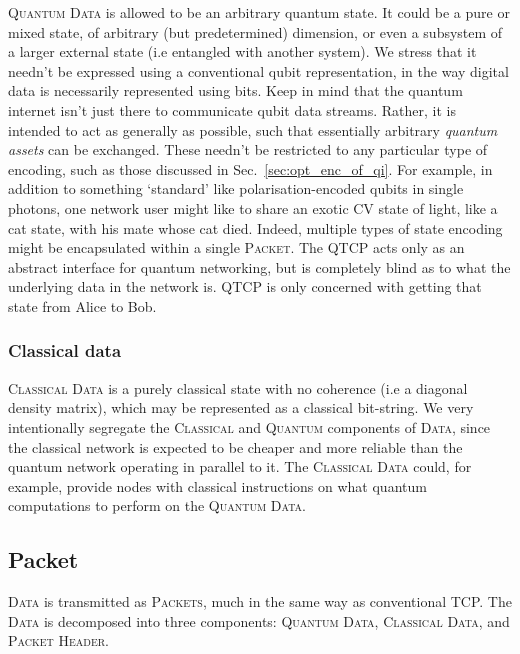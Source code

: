 \documentclass[aps, rmp, twocolumn, amsmath, amssymb, nofootinbib, superscriptaddress, longbibliography, floatfix, table-of-contents, eqsecnum]{revtex4-1}
\begin{document}
\textsc{Quantum Data} is allowed to be an arbitrary quantum state. It could be a pure or mixed state, of arbitrary (but predetermined) dimension, or even a subsystem of a larger external state (i.e entangled with another system). We stress that it needn't be expressed using a conventional qubit representation, in the way digital data is necessarily represented using bits. Keep in mind that the quantum internet isn't just there to communicate qubit data streams. Rather, it is intended to act as generally as possible, such that essentially arbitrary \textit{quantum assets} can be exchanged. These needn't be restricted to any particular type of encoding, such as those discussed in Sec.~\ref{sec:opt_enc_of_qi}. For example, in addition to something `standard' like polarisation-encoded qubits in single photons, one network user might like to share an exotic CV state of light, like a cat state, with his mate whose cat died. Indeed, multiple types of state encoding might be encapsulated within a single \textsc{Packet}. The QTCP acts only as an abstract interface for quantum networking, but is completely blind as to what the underlying data in the network is. QTCP is only concerned with getting that state from Alice to Bob.

%
%

\subsubsection{Classical data} 

\textsc{Classical Data} is a purely classical state with no coherence (i.e a diagonal density matrix), which may be represented as a classical bit-string. We very intentionally segregate the \textsc{Classical} and \textsc{Quantum} components of \textsc{Data}, since the classical network is expected to be cheaper and more reliable than the quantum network operating in parallel to it. The \textsc{Classical Data} could, for example, provide nodes with classical instructions on what quantum computations to perform on the \textsc{Quantum Data}.

%
%

\subsection{Packet} 

\textsc{Data} is transmitted as \textsc{Packets}, much in the same way as conventional TCP. The \textsc{Data} is decomposed into three components: \textsc{Quantum Data}, \textsc{Classical Data}, and \textsc{Packet Header}.
\end{document}
